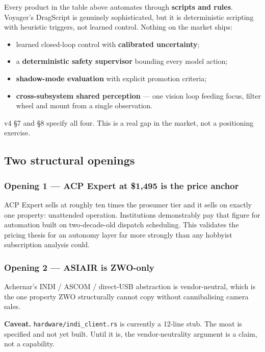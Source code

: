 \documentclass[11pt]{article}
\newcommand{\dollar}[1]{\$#1}
\begin{document}
Every product in the table above automates through \textbf{scripts and rules}.
Voyager's DragScript is genuinely sophisticated, but it is deterministic
scripting with heuristic triggers, not learned control. Nothing on the market
ships:

\begin{itemize}[leftmargin=1.4em,itemsep=2pt]
  \item learned closed-loop control with \textbf{calibrated uncertainty};
  \item a \textbf{deterministic safety supervisor} bounding every model action;
  \item \textbf{shadow-mode evaluation} with explicit promotion criteria;
  \item \textbf{cross-subsystem shared perception} --- one vision loop feeding
        focus, filter wheel and mount from a single observation.
\end{itemize}

v4 §7 and §8 specify all four. This is a real gap in the market, not a
positioning exercise.

\subsection{Two structural openings}

\subsubsection*{Opening 1 --- ACP Expert at \dollar{1{,}495} is the price anchor}

ACP Expert sells at roughly ten times the prosumer tier and it sells on exactly
one property: unattended operation. Institutions demonstrably pay that figure
for automation built on two-decade-old dispatch scheduling. This validates the
pricing thesis for an autonomy layer far more strongly than any hobbyist
subscription analysis could.

\subsubsection*{Opening 2 --- ASIAIR is ZWO-only}

Achernar's INDI / ASCOM / direct-USB abstraction is vendor-neutral, which is the
one property ZWO structurally cannot copy without cannibalising camera sales.

\begin{redbox}
\textbf{Caveat.} \texttt{hardware/indi\_client.rs} is currently a 12-line stub.
The moat is specified and not yet built. Until it is, the vendor-neutrality
argument is a claim, not a capability.
\end{redbox}
\end{document}
